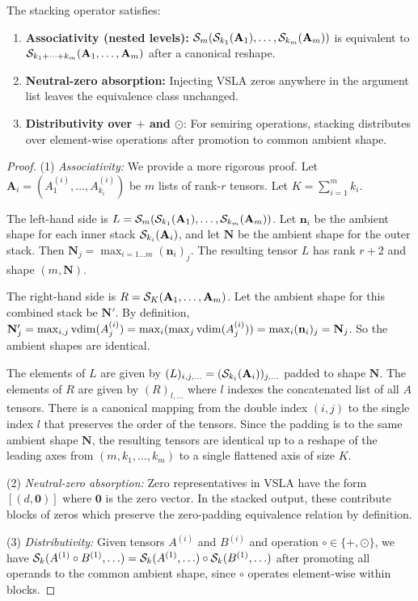 \begin{theorem}
\label{thm:stacking-properties}
The stacking operator satisfies:
\begin{enumerate}
\item \textbf{Associativity (nested levels):} $\mathcal{S}_m(\mathcal{S}_{k_1}(\mathbf{A}_1), \dots, \mathcal{S}_{k_m}(\mathbf{A}_m))$ is equivalent to $\mathcal{S}_{k_1+\dots+k_m}(\mathbf{A}_1, \dots, \mathbf{A}_m)$ after a canonical reshape.
\item \textbf{Neutral-zero absorption:} Injecting VSLA zeros anywhere in the argument list leaves the equivalence class unchanged.
\item \textbf{Distributivity over $+$ and $\odot$}: For semiring operations, stacking distributes over element-wise operations after promotion to common ambient shape.
\end{enumerate}
\end{theorem}

\begin{proof}
(1) \emph{Associativity:} We provide a more rigorous proof. Let $\mathbf{A}_i = (A^{(i)}_1, \dots, A^{(i)}_{k_i})$ be $m$ lists of rank-$r$ tensors. Let $K = \sum_{i=1}^m k_i$. 

The left-hand side is $L = \mathcal{S}_m(\mathcal{S}_{k_1}(\mathbf{A}_1), \dots, \mathcal{S}_{k_m}(\mathbf{A}_m))$. Let $\mathbf{n}_i$ be the ambient shape for each inner stack $\mathcal{S}_{k_i}(\mathbf{A}_i)$, and let $\mathbf{N}$ be the ambient shape for the outer stack. Then $\mathbf{N}_j = \max_{i=1\dots m} (\mathbf{n}_i)_j$. The resulting tensor $L$ has rank $r+2$ and shape $(m, \mathbf{N})$.

The right-hand side is $R = \mathcal{S}_K(\mathbf{A}_1, \dots, \mathbf{A}_m)$. Let the ambient shape for this combined stack be $\mathbf{N}'$. By definition, $\mathbf{N}'_j = \max_{i,j} \operatorname{vdim}(A^{(i)}_j) = \max_i (\max_j \operatorname{vdim}(A^{(i)}_j)) = \max_i (\mathbf{n}_i)_j = \mathbf{N}_j$. So the ambient shapes are identical.

The elements of $L$ are given by $(L)_{i,j,...} = (\mathcal{S}_{k_i}(\mathbf{A}_i))_{j,...}$ padded to shape $\mathbf{N}$. The elements of $R$ are given by $(R)_{l,...}$ where $l$ indexes the concatenated list of all $A$ tensors. There is a canonical mapping from the double index $(i,j)$ to the single index $l$ that preserves the order of the tensors. Since the padding is to the same ambient shape $\mathbf{N}$, the resulting tensors are identical up to a reshape of the leading axes from $(m, k_1, \dots, k_m)$ to a single flattened axis of size $K$.

(2) \emph{Neutral-zero absorption:} Zero representatives in VSLA have the form $[(d, \mathbf{0})]$ where $\mathbf{0}$ is the zero vector. In the stacked output, these contribute blocks of zeros which preserve the zero-padding equivalence relation by definition.

(3) \emph{Distributivity:} Given tensors $A^{(i)}$ and $B^{(i)}$ and operation $\circ \in \{+, \odot\}$, we have $\mathcal{S}_k(A^{(1)} \circ B^{(1)}, \ldots) = \mathcal{S}_k(A^{(1)}, \ldots) \circ \mathcal{S}_k(B^{(1)}, \ldots)$ after promoting all operands to the common ambient shape, since $\circ$ operates element-wise within blocks.
\end{proof}

